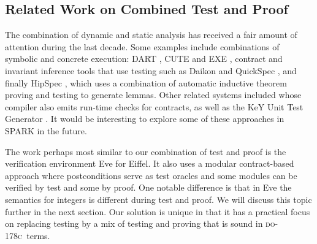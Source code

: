 \documentclass[sttt,final]{svjour}
\newcommand{\DOC}{\textsc{do-178c}}
\begin{document}
\subsection{Related Work on Combined Test and Proof}
The combination of dynamic and static analysis has received a fair
amount of attention during the last decade. Some examples include
combinations of symbolic and concrete execution: DART \cite{DART2005},
CUTE \cite{CUTE2005} and EXE \cite{EXE2006}, contract and invariant
inference tools that use testing such as Daikon \cite{ErnstPGMPTX2007} and
QuickSpec \cite{QuickSpec2010}, and finally HipSpec \cite{HipSpec2012},
which uses a combination of automatic inductive theorem proving and
testing to generate lemmas. Other related systems included \cite{specsharp}
whose compiler also emits run-time checks for contracts, as well as the KeY
Unit Test Generator \cite{KeYGenU}. It would be interesting to explore some
of these approaches in SPARK in the future.

The work perhaps most similar to our combination of test and proof is
the verification environment Eve \cite{Tschannen:2011} for Eiffel.
It also uses a modular contract-based approach where postconditions
serve as test oracles and some modules can be verified by test and
some by proof. One notable difference is that in Eve the semantics for
integers is different during test and proof. We will discuss this
topic further in the next section. Our solution is unique in that it
has a practical focus on replacing testing by a mix of testing and
proving that is sound in \DOC\ terms.
\end{document}
